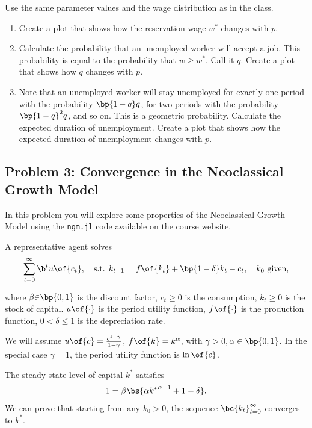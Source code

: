 \documentclass[english,hyperref={pdftex,pdfpagemode=UseNone,hidelinks}]{tufte-handout}
\begin{document}
Use the same parameter values and the wage distribution as in the class. 

\begin{enumerate}
\item Create a plot that shows how the reservation wage $w^*$ changes with $p$. 
\item Calculate the probability that an unemployed worker will accept a job. This probability is equal to the probability that $w \geq w^*$. Call it $q$. Create a plot that shows how $q$ changes with $p$. 
\item Note that an unemployed worker will stay unemployed for exactly one period with the probability $\bp{1-q}q$, for two periods with the probability $\bp{1-q}^2 q$, and so on. This is a geometric probability. Calculate the expected duration of unemployment. Create a plot that shows how the expected duration of unemployment changes with $p$. 
\end{enumerate}


\subsection*{Problem 3: Convergence in the Neoclassical Growth Model}

In this problem you will explore some properties of the Neoclassical Growth Model using the \texttt{ngm.jl} code available on the course website. 

A representative agent solves 
         \begin{align*}\sum_{t=0}^\infty \b^t u\of{c_t}, \quad \text{s.t. } k_{t+1} = f\of{k_t} + \bp{1-\delta} k_t - c_t, \quad k_0 \text{ given},
         \end{align*} 
         
         where $\beta{\in}\bp{0,1}$ is the discount factor, $c_t\geq0$ is the consumption, $k_{t}\geq 0$ is the stock of capital.  $u\of{\cdot}$ is the period utility function, $f\of{\cdot}$ is the production function, $0<\delta\leq 1$ is the depreciation rate.

We will assume $u\of{c} = \frac{c^{1-\gamma}}{1-\gamma}$, $f\of{k} = k^\alpha$, with $\gamma>0,\alpha\in\bp{0,1}$. In the special case $\gamma=1$, the period utility function is $\ln\of{c}$.

The steady state level of capital $k^*$ satisfies \begin{align*}
        1 = \beta \bs{\alpha {k^*}^{\alpha-1} + 1-\delta}.
       \end{align*}
We can prove that starting from any $k_0>0$, the sequence $\bc{k_t}_{t=0}^\infty$ converges to $k^*$.
\end{document}
